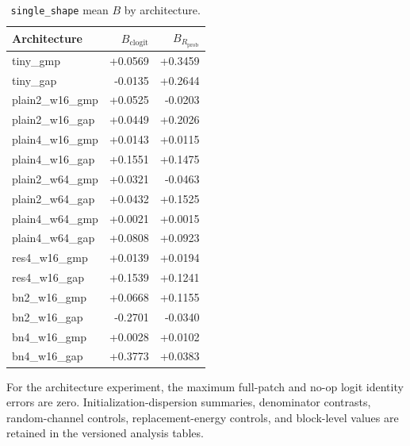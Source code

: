 \begin{table}[h]
\caption{\texttt{single\_shape} mean $B$ by architecture.}
\label{tab:app-architecture-single}
\centering
\scriptsize
\begin{tabular}{lrr}
\toprule
Architecture & $B_{\mathrm{clogit}}$ & $B_{R_{\mathrm{prob}}}$ \\
\midrule
tiny\_gmp & +0.0569 & +0.3459 \\
tiny\_gap & -0.0135 & +0.2644 \\
plain2\_w16\_gmp & +0.0525 & -0.0203 \\
plain2\_w16\_gap & +0.0449 & +0.2026 \\
plain4\_w16\_gmp & +0.0143 & +0.0115 \\
plain4\_w16\_gap & +0.1551 & +0.1475 \\
plain2\_w64\_gmp & +0.0321 & -0.0463 \\
plain2\_w64\_gap & +0.0432 & +0.1525 \\
plain4\_w64\_gmp & +0.0021 & +0.0015 \\
plain4\_w64\_gap & +0.0808 & +0.0923 \\
res4\_w16\_gmp & +0.0139 & +0.0194 \\
res4\_w16\_gap & +0.1539 & +0.1241 \\
bn2\_w16\_gmp & +0.0668 & +0.1155 \\
bn2\_w16\_gap & -0.2701 & -0.0340 \\
bn4\_w16\_gmp & +0.0028 & +0.0102 \\
bn4\_w16\_gap & +0.3773 & +0.0383 \\
\bottomrule
\end{tabular}
\end{table}

For the architecture experiment, the maximum full-patch and no-op logit identity errors are zero. Initialization-dispersion summaries, denominator contrasts, random-channel controls, replacement-energy controls, and block-level values are retained in the versioned analysis tables.
